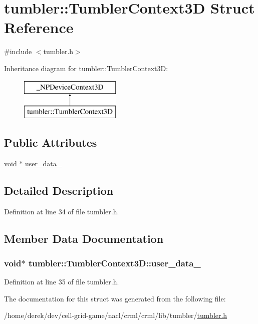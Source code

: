 \hypertarget{structtumbler_1_1_tumbler_context3_d}{
\section{tumbler::TumblerContext3D Struct Reference}
\label{structtumbler_1_1_tumbler_context3_d}
}


{\ttfamily \#include $<$tumbler.h$>$}

Inheritance diagram for tumbler::TumblerContext3D:\begin{figure}[H]
\begin{center}
\leavevmode
\includegraphics[height=2cm]{structtumbler_1_1_tumbler_context3_d}
\end{center}
\end{figure}
\subsection*{Public Attributes}
\begin{DoxyCompactItemize}
\item 
void $\ast$ \hyperlink{structtumbler_1_1_tumbler_context3_d_a1274a5b24b002c4e264bc7ee9298e85d}{user\_\-data\_\-}
\end{DoxyCompactItemize}


\subsection{Detailed Description}


Definition at line 34 of file tumbler.h.



\subsection{Member Data Documentation}
\hypertarget{structtumbler_1_1_tumbler_context3_d_a1274a5b24b002c4e264bc7ee9298e85d}{
\subsubsection[{user\_\-data\_\-}]{\setlength{\rightskip}{0pt plus 5cm}void$\ast$ {\bf tumbler::TumblerContext3D::user\_\-data\_\-}}}
\label{structtumbler_1_1_tumbler_context3_d_a1274a5b24b002c4e264bc7ee9298e85d}


Definition at line 35 of file tumbler.h.



The documentation for this struct was generated from the following file:\begin{DoxyCompactItemize}
\item 
/home/derek/dev/cell-\/grid-\/game/nacl/crml/crml/lib/tumbler/\hyperlink{tumbler_8h}{tumbler.h}\end{DoxyCompactItemize}

